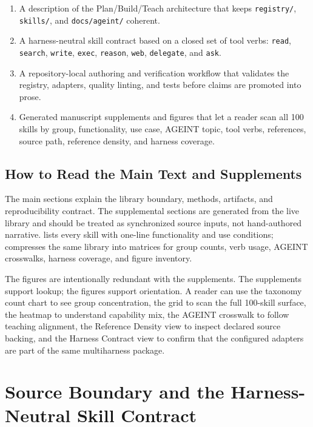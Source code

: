 \documentclass[
]{article}
\providecommand{\tightlist}{%
  \setlength{\itemsep}{0pt}\setlength{\parskip}{0pt}}
\begin{document}
\begin{enumerate}
\def\labelenumi{\arabic{enumi}.}
\tightlist
\item
  A description of the Plan/Build/Teach architecture that keeps
  \texttt{registry/}, \texttt{skills/}, and \texttt{docs/ageint/}
  coherent.
\item
  A harness-neutral skill contract based on a closed set of tool verbs:
  \texttt{read}, \texttt{search}, \texttt{write}, \texttt{exec},
  \texttt{reason}, \texttt{web}, \texttt{delegate}, and \texttt{ask}.
\item
  A repository-local authoring and verification workflow that validates
  the registry, adapters, quality linting, and tests before claims are
  promoted into prose.
\item
  Generated manuscript supplements and figures that let a reader scan
  all 100 skills by group, functionality, use case, AGEINT topic, tool
  verbs, references, source path, reference density, and harness
  coverage.
\end{enumerate}

\subsection{How to Read the Main Text and
Supplements}\label{how-to-read-the-main-text-and-supplements}

The main sections explain the library boundary, methods, artifacts, and
reproducibility contract. The supplemental sections are generated from
the live library and should be treated as synchronized source inputs,
not hand-authored narrative.  lists
every skill with one-line functionality and use conditions;
 compresses the same library
into matrices for group counts, verb usage, AGEINT crosswalks, harness
coverage, and figure inventory.

The figures are intentionally redundant with the supplements. The
supplements support lookup; the figures support orientation. A reader
can use the taxonomy count chart to see group concentration, the grid to
scan the full 100-skill surface, the heatmap to understand capability
mix, the AGEINT crosswalk to follow teaching alignment, the Reference
Density view to inspect declared source backing, and the Harness
Contract view to confirm that the configured adapters are part of the
same multiharness package.

\newpage

\section{Source Boundary and the Harness-Neutral Skill
Contract}\label{sec:system_context}
\end{document}
